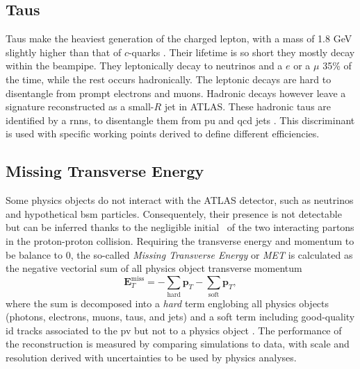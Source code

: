 \subsection{Taus}
Taus make the heaviest generation of the charged lepton, with a mass of 1.8 GeV slightly higher than that of $c$-quarks \cite{Tanabashi:2018oca}. Their lifetime is so short they mostly decay within the beampipe. They leptonically decay to neutrinos and a $e$ or a $\mu$ 35\% of the time, while the rest occurs hadronically. The leptonic decays are hard to disentangle from prompt electrons and muons. Hadronic decays however leave a signature reconstructed as a small-$R$ jet in ATLAS. These hadronic taus are identified by a \glspl{rnn}, to disentangle them from \gls{pu} and \gls{qcd} jets \cite{ATL-PHYS-PUB-2019-033}. This discriminant is used with specific working points derived to define different efficiencies. 

\subsection{Missing Transverse Energy}
Some physics objects do not interact with the ATLAS detector, such as neutrinos and hypothetical \gls{bsm} particles. Consequentely, their presence is not detectable but can be inferred thanks to the negligible initial \pt\ of the two interacting partons in the proton-proton collision. Requiring the transverse energy and momentum to be balance to 0, the so-called \textit{Missing Transverse Energy \etm} or \textit{MET} is calculated as the negative vectorial sum of all physics object transverse momentum
\begin{equation}
  \boldsymbol{E}_T^{\text{miss}} = - \sum_{\text{hard}} \boldsymbol{p}_T - \sum_{\text{soft}} \boldsymbol{p}_T,
\end{equation}
where the sum is decomposed into a \textit{hard} term englobing all physics objects (photons, electrons, muons, taus, and jets) and a soft term including good-quality \gls{id} tracks associated to the \gls{pv} but not to a physics object \cite{ATLASmetReco}. The performance of the reconstruction is measured by comparing simulations to data, with scale and resolution derived with uncertainties to be used by physics analyses. 